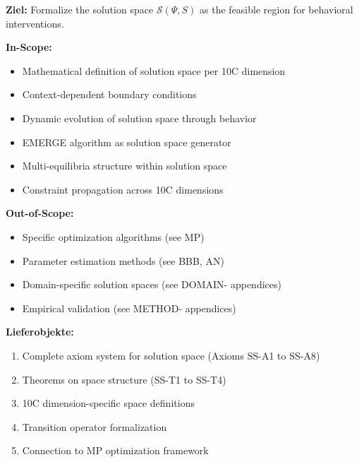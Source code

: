 \begin{tcolorbox}[colback=gray!10, colframe=gray!50!black, title=Chapter Scope]
\textbf{Ziel:} Formalize the solution space $\mathcal{S}(\Psi, S)$ as the feasible region for behavioral interventions.

\textbf{In-Scope:}
\begin{itemize}
    \item Mathematical definition of solution space per 10C dimension
    \item Context-dependent boundary conditions
    \item Dynamic evolution of solution space through behavior
    \item EMERGE algorithm as solution space generator
    \item Multi-equilibria structure within solution space
    \item Constraint propagation across 10C dimensions
\end{itemize}

\textbf{Out-of-Scope:}
\begin{itemize}
    \item Specific optimization algorithms (see MP)
    \item Parameter estimation methods (see BBB, AN)
    \item Domain-specific solution spaces (see DOMAIN- appendices)
    \item Empirical validation (see METHOD- appendices)
\end{itemize}

\textbf{Lieferobjekte:}
\begin{enumerate}
    \item Complete axiom system for solution space (Axioms SS-A1 to SS-A8)
    \item Theorems on space structure (SS-T1 to SS-T4)
    \item 10C dimension-specific space definitions
    \item Transition operator formalization
    \item Connection to MP optimization framework
\end{enumerate}
\end{tcolorbox}

